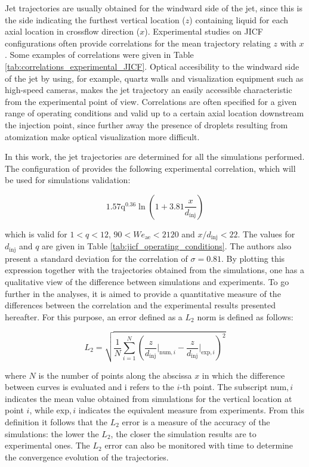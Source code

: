 Jet trajectories are usually obtained for the windward side of the jet, since this is the side indicating the furthest vertical location ($z$) containing liquid for each axial location in crossflow direction ($x$). Experimental studies on JICF configurations often provide correlations for the mean trajectory relating $z$ with $x$. Some examples of correlations were given in Table \ref{tab:correlations_experimental_JICF}. Optical accesibility to the windward side of the jet by using, for example, quartz walls and visualization equipment such as high-speed cameras, makes the jet trajectory an easily accessible characteristic from the experimental point of view. Correlations are often specified for a given range of operating conditions and valid up to a certain axial location downstream the injection point, since further away the presence of droplets resulting from atomization make optical visualization more difficult.

In this work, the jet trajectories are determined for all the simulations performed. The configuration of  provides the following experimental correlation, which will be used for simulations validation:

\begin{equation}
1.57 \mathrm{q}^{0.36} \ln \left( 1 + 3.81 \frac{x}{d_\mathrm{inj}} \right)
\end{equation}

which is valid for $1 < q < 12$, $90 < We_\mathrm{ae} < 2120$ and $x/d_\mathrm{inj} < 22$. The values for $d_\mathrm{inj}$ and $q$ are given
in Table \ref{tab:jicf_operating_conditions}. The authors also present a standard deviation for the correlation of $\sigma = 0.81$. By plotting this expression together with the trajectories obtained from the simulations, one has a qualitative view of the difference between simulations and experiments. To go further in the analyses, it is aimed to provide a quantitative measure of the differences between the correlation and the experimental results presented hereafter. For this purpose, an error defined as a $L_2$ norm is defined as follows:

\begin{equation}
\label{eq:L2_JICF}
    L_2 = \sqrt{\frac{1}{N}   \sum_{i=1}^N \left( \frac{z}{d_\mathrm{inj}} \Bigr|_{\mathrm{num},i} -   \frac{z}{d_\mathrm{inj}} \Bigr|_{\mathrm{exp},i} \right)^2}
\end{equation}

where $N$ is the number of points along the abscissa $x$ in which the difference between curves is evaluated and i refers to the $i$-th point. The subscript num$,i$ indicates the mean value obtained from simulations for the vertical location at point $i$, while exp$,i$ indicates the equivalent measure from experiments. From this definition it follows that the $L_2$ error is a measure of the accuracy of the simulations: the lower the $L_2$, the closer the simulation results are to experimental ones. The $L_2$ error can also be monitored with time to determine the convergence evolution of the trajectories.

